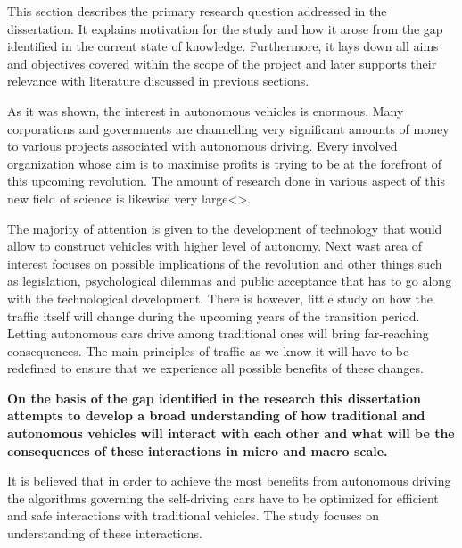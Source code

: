 \documentclass[11pt,english]{article}
\begin{document}
This section describes the primary research question addressed in the dissertation. It explains motivation for the study and how it arose from the gap identified in the current state of knowledge. Furthermore, it lays down all aims and objectives covered within the scope of the project and later supports their relevance with literature discussed in previous sections.


\par



As it was shown, the interest in autonomous vehicles is enormous. Many corporations and governments are channelling very significant amounts of money to various projects associated with autonomous driving. Every involved organization whose aim is to maximise profits is trying to be at the forefront of this upcoming revolution. The amount of research done in various aspect of this new field of science is likewise very large<>. 
\par
The majority of attention is given to the development of technology that would allow to construct vehicles with higher level of autonomy. Next wast area of interest focuses on possible implications of the revolution and other things such as legislation, psychological dilemmas and public acceptance that has to go along with the technological development. There is however, little study on how the traffic itself will change during the upcoming years of the transition period. Letting autonomous cars drive among traditional ones will bring far-reaching consequences. The main principles of traffic as we know it will have to be redefined to ensure that we experience all possible benefits of these changes. 
\par
\textbf{On the basis of the gap identified in the research this dissertation attempts to develop a broad understanding of how traditional and autonomous vehicles will interact with each other and what will be the consequences of these interactions in micro and macro scale.}



\par

It is believed that in order to achieve the most benefits from autonomous driving the algorithms governing the self-driving cars have to be optimized for efficient and safe interactions with traditional vehicles. The study focuses on understanding of these interactions. 


\end{document}
